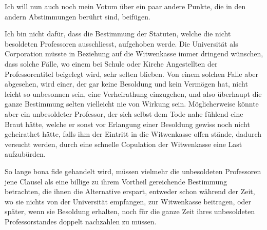 \documentclass[12pt,a4paper]{article}
\begin{document}
Ich will nun auch noch mein Votum \"uber ein paar andere Punkte, die in den andern Abstimmungen ber\"uhrt sind, beif\"ugen.

Ich bin nicht daf\"ur, dass die Bestimmung der Statuten, welche die nicht besoldeten Professoren ausschliesst, aufgehoben werde. Die Universit\"at als Corporation m\"usste in Beziehung auf die Witwenkasse immer dringend w\"unschen, dass solche F\"alle, wo einem bei Schule oder Kirche Angestellten der Professorentitel beigelegt wird, sehr selten blieben. Von einem solchen Falle aber abgesehen, wird einer, der gar keine Besoldung und kein Verm\"ogen hat, nicht leicht so unbesonnen sein, eine Verheirathung einzugehen, und also \"uberhaupt die ganze Bestimmung selten vielleicht nie von Wirkung sein. M\"oglicherweise k\"onnte aber ein unbesoldeter Professor, der sich selbst dem Tode nahe f\"uhlend eine Braut h\"atte, welche er sonst vor Erlangung einer Besoldung gewiss noch nicht geheirathet h\"atte, falls ihm der Eintritt in die Witwenkasse offen st\"ande, dadurch versucht werden, durch eine schnelle Copulation der Witwenkasse eine Last aufzub\"urden.

So lange bona fide gehandelt wird, m\"ussen vielmehr die unbesoldeten Professoren jene Clausel als eine billige zu ihrem Vortheil gereichende Bestimmung betrachten, die ihnen die Alternative erspart, entweder schon w\"ahrend der Zeit, wo sie nichts von der Universit\"at empfangen, zur Witwenkasse beitragen, oder sp\"ater, wenn sie Besoldung erhalten, noch f\"ur die ganze Zeit ihres unbesoldeten Professorstandes doppelt nachzahlen zu m\"ussen.
\end{document}
